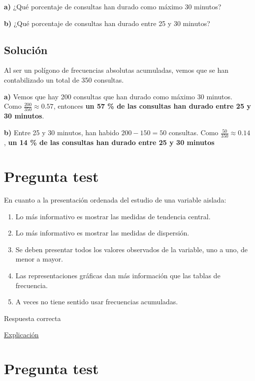 \documentclass[
]{book}
\providecommand{\tightlist}{%
  \setlength{\itemsep}{0pt}\setlength{\parskip}{0pt}}
\begin{document}
\textbf{a)} ¿Qué porcentaje de consultas han durado como máximo 30 minutos?

\textbf{b)} ¿Qué porcentaje de consultas han durado entre 25 y 30 minutos?

\hypertarget{soluciuxf3n-4}{%
\subsection{Solución}\label{soluciuxf3n-4}}

Al ser un polígono de frecuencias absolutas acumuladas, vemos que se han contabilizado un total de 350 consultas.

\textbf{a)} Vemos que hay 200 consultas que han durado como máximo 30 minutos. Como \(\frac{200}{350} \approx 0.57\), entonces \textbf{un 57 \% de las consultas han durado entre 25 y 30 minutos}.

\textbf{b)} Entre 25 y 30 minutos, han habido \(200 - 150 = 50\) consultas. Como \(\frac{50}{350} \approx 0.14\), \textbf{un 14 \% de las consultas han durado entre 25 y 30 minutos}

\hypertarget{pregunta-test-52}{%
\section{Pregunta test}\label{pregunta-test-52}}

En cuanto a la presentación ordenada del estudio de una variable aislada:

\begin{enumerate}
\def\labelenumi{\alph{enumi})}
\tightlist
\item
  Lo más informativo es mostrar las medidas de tendencia central.
\item
  Lo más informativo es mostrar las medidas de dispersión.
\item
  Se deben presentar todos los valores observados de la variable, uno a uno, de menor a mayor.
\item
  Las representaciones gráficas dan más información que las tablas de frecuencia.
\item
  A veces no tiene sentido usar frecuencias acumuladas.
\end{enumerate}

Respuesta correcta

\href{https://1fjmanzano.github.io/bioestadistica/otros-gra\%CC\%81ficos.html}{Explicación}

\hypertarget{pregunta-test-53}{%
\section{Pregunta test}\label{pregunta-test-53}}
\end{document}
